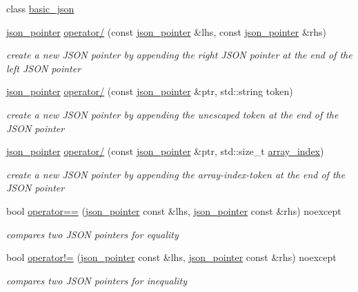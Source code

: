\begin{DoxyCompactItemize}
\item 
class \mbox{\hyperlink{classnlohmann_1_1json__pointer_ada3100cdb8700566051828f1355fa745}{basic\+\_\+json}}
\item 
\mbox{\hyperlink{classnlohmann_1_1json__pointer}{json\+\_\+pointer}} \mbox{\hyperlink{classnlohmann_1_1json__pointer_a90a11fe6c7f37b1746a3ff9cb24b0d53}{operator/}} (const \mbox{\hyperlink{classnlohmann_1_1json__pointer}{json\+\_\+pointer}} \&lhs, const \mbox{\hyperlink{classnlohmann_1_1json__pointer}{json\+\_\+pointer}} \&rhs)
\begin{DoxyCompactList}\small\item\em create a new J\+S\+ON pointer by appending the right J\+S\+ON pointer at the end of the left J\+S\+ON pointer \end{DoxyCompactList}\item 
\mbox{\hyperlink{classnlohmann_1_1json__pointer}{json\+\_\+pointer}} \mbox{\hyperlink{classnlohmann_1_1json__pointer_a926c9065dbed1bedc17857a813f7a46f}{operator/}} (const \mbox{\hyperlink{classnlohmann_1_1json__pointer}{json\+\_\+pointer}} \&ptr, std\+::string token)
\begin{DoxyCompactList}\small\item\em create a new J\+S\+ON pointer by appending the unescaped token at the end of the J\+S\+ON pointer \end{DoxyCompactList}\item 
\mbox{\hyperlink{classnlohmann_1_1json__pointer}{json\+\_\+pointer}} \mbox{\hyperlink{classnlohmann_1_1json__pointer_a9f6bc6f4d4668b4e9a19d8b8ac29da4f}{operator/}} (const \mbox{\hyperlink{classnlohmann_1_1json__pointer}{json\+\_\+pointer}} \&ptr, std\+::size\+\_\+t \mbox{\hyperlink{classnlohmann_1_1json__pointer_ac53f5b79dd91da78743c437832f57ce4}{array\+\_\+index}})
\begin{DoxyCompactList}\small\item\em create a new J\+S\+ON pointer by appending the array-\/index-\/token at the end of the J\+S\+ON pointer \end{DoxyCompactList}\item 
bool \mbox{\hyperlink{classnlohmann_1_1json__pointer_a4667ef558c8c3f8a646bfda0c6654653}{operator==}} (\mbox{\hyperlink{classnlohmann_1_1json__pointer}{json\+\_\+pointer}} const \&lhs, \mbox{\hyperlink{classnlohmann_1_1json__pointer}{json\+\_\+pointer}} const \&rhs) noexcept
\begin{DoxyCompactList}\small\item\em compares two J\+S\+ON pointers for equality \end{DoxyCompactList}\item 
bool \mbox{\hyperlink{classnlohmann_1_1json__pointer_a6779edcf28e6f018a3bbb29c0b4b5e1e}{operator!=}} (\mbox{\hyperlink{classnlohmann_1_1json__pointer}{json\+\_\+pointer}} const \&lhs, \mbox{\hyperlink{classnlohmann_1_1json__pointer}{json\+\_\+pointer}} const \&rhs) noexcept
\begin{DoxyCompactList}\small\item\em compares two J\+S\+ON pointers for inequality \end{DoxyCompactList}\end{DoxyCompactItemize}


